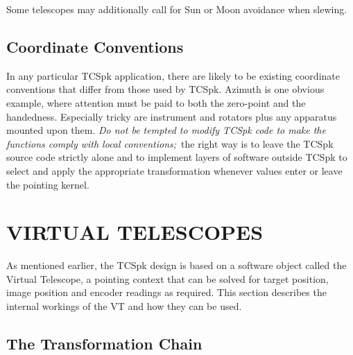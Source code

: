 \documentclass[12pt,fleqn,twoside]{article}
\renewcommand{\_}{{\tt\char'137}}     %
\begin{document}
Some telescopes may additionally call for Sun or Moon avoidance
when slewing.

\subsection{Coordinate Conventions}

In any particular TCSpk application, there are likely to be
existing coordinate conventions that differ from those used by TCSpk.
Azimuth is one obvious example, where attention must be paid to both
the zero-point and the handedness.  Especially tricky are instrument
and rotators plus any apparatus mounted upon them.  {\it Do not be
tempted to modify TCSpk code to make the functions
comply with local conventions;}\  the
right way is to leave the TCSpk source code strictly alone and
to implement layers of software outside TCSpk to select
and apply the appropriate transformation whenever values enter or
leave the pointing kernel.

\newpage
\section{VIRTUAL TELESCOPES}

As mentioned earlier, the TCSpk design is based on a software object
called the Virtual Telescope, a pointing context that can
be solved for target position, image position and encoder readings
as required.  This section describes the internal workings of the
VT and how they can be used.

\subsection{The Transformation Chain}


%
%
\end{document}
